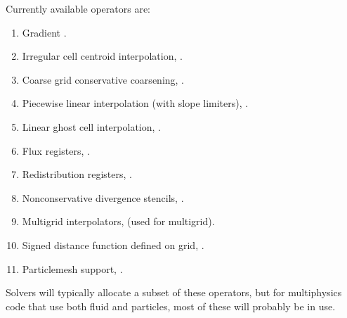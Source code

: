 \documentclass[letterpaper,10pt,english]{sphinxmanual}
\begin{document}
\sphinxAtStartPar
Currently available operators are:
\begin{enumerate}
%
\item {} 
\sphinxAtStartPar
Gradient .

\item {} 
\sphinxAtStartPar
Irregular cell centroid interpolation, .

\item {} 
\sphinxAtStartPar
Coarse grid conservative coarsening, .

\item {} 
\sphinxAtStartPar
Piecewise linear interpolation (with slope limiters), .

\item {} 
\sphinxAtStartPar
Linear ghost cell interpolation, .

\item {} 
\sphinxAtStartPar
Flux registers, .

\item {} 
\sphinxAtStartPar
Redistribution registers, .

\item {} 
\sphinxAtStartPar
Non\sphinxhyphen{}conservative divergence stencils, .

\item {} 
\sphinxAtStartPar
Multigrid interpolators,  (used for multigrid).

\item {} 
\sphinxAtStartPar
Signed distance function defined on grid, .

\item {} 
\sphinxAtStartPar
Particle\sphinxhyphen{}mesh support, .

\end{enumerate}

\sphinxAtStartPar
Solvers will typically allocate a subset of these operators, but for multiphysics code that use both fluid and particles, most of these will probably be in use.
\end{document}
